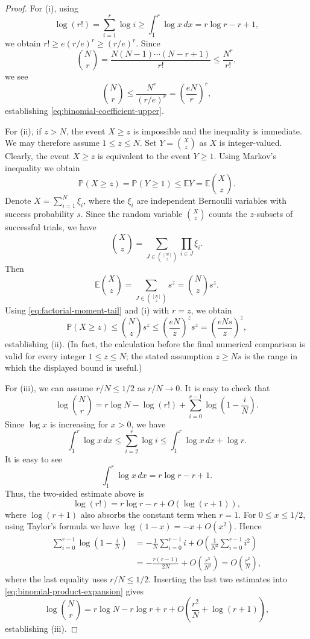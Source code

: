 \documentclass[11pt,reqno]{amsart}
\theoremstyle{definition}
\theoremstyle{remark}
\newcommand{\EE}{\mathbb E}
\newcommand{\PP}{\mathbb P}
\begin{document}
\begin{proof}
For (i), using
\[
 \log(r!)=\sum_{i=1}^r\log i
 \ge\int_1^r\log x\,dx
 =r\log r-r+1,
\]
we obtain $r!\ge e(r/e)^r\ge(r/e)^r$.  Since
\[
 \binom Nr
 =\frac{N(N-1)\cdots(N-r+1)}{r!}
 \le\frac{N^r}{r!},
\]
we see
\[
 \binom Nr\le\frac{N^r}{(r/e)^r}
 =\left(\frac{eN}{r}\right)^r,
\]
establishing \eqref{eq:binomial-coefficient-upper}.

For (ii), if $z>N$, the event $X\ge z$ is impossible and the inequality
is immediate. We may therefore assume $1\le z\le N$.
Set $Y=\binom Xz$ as $X$ is integer-valued. Clearly, the event $X\ge z$ is equivalent to the event $Y\ge1$.  Using Markov's
inequality we obtain
\begin{equation}\label{eq:factorial-moment-tail}
 \PP(X\ge z)=\PP(Y\ge 1)\le\EE Y
 =\EE\binom Xz.
\end{equation}
Denote $X=\sum_{i=1}^N\xi_i$, where the $\xi_i$ are independent Bernoulli
variables with success probability $s$.  Since the random variable $\binom Xz$
counts the $z$-subsets of successful trials, we have
\[
 \binom Xz
 =\sum_{J\in\binom{[N]}z}\prod_{i\in J}\xi_i.
\]
Then
\[
 \EE\binom Xz
 =\sum_{J\in\binom{[N]}z}s^z
 =\binom Nzs^z.
\]
Using \eqref{eq:factorial-moment-tail} and (i) with $r=z$, we obtain 
\[
 \PP(X\ge z)
 \le\binom Nzs^z
 \le\left(\frac{eN}{z}\right)^zs^z
 =\left(\frac{eNs}{z}\right)^z,
\]
establishing (ii).  (In fact, the calculation before the final numerical
comparison is valid for every integer $1\le z\le N$; the stated assumption
$z\ge Ns$ is the range in which the displayed bound is useful.)

For (iii), we can assume $r/N\le1/2$ as $r/N\to0$.  It is easy to check that
\begin{equation}\label{eq:binomial-product-expansion}
 \log\binom Nr
 =r\log N-\log(r!)
  +\sum_{i=0}^{r-1}\log\left(1-\frac{i}{N}\right).
\end{equation}
Since $\log x$ is increasing for $x>0$, we have
\[
 \int_1^r\log x\,dx
 \le\sum_{i=2}^r\log i
 \le\int_1^r\log x\,dx+\log r.
\]
It is easy to see 
$$\int_1^r\log x\,dx=r\log r-r+1.$$
Thus, the two-sided estimate above is
\[
 \log(r!)=r\log r-r+O(\log(r+1)),
\]
where $\log(r+1)$ also absorbs the constant term when $r=1$.
For $0\le x\le1/2$, using Taylor's formula we have 
$\log(1-x)=-x+O(x^2)$.  
Hence
\begin{align*}
 \sum_{i=0}^{r-1}\log\left(1-\frac{i}{N}\right)
 &=-\frac1N\sum_{i=0}^{r-1}i
   +O\!\left(\frac1{N^2}\sum_{i=0}^{r-1}i^2\right)\\
 &=-\frac{r(r-1)}{2N}+O\!\left(\frac{r^3}{N^2}\right)
 =O\!\left(\frac{r^2}{N}\right),
\end{align*}
where the last equality uses $r/N\le1/2$.  Inserting the last two estimates
into \eqref{eq:binomial-product-expansion} gives
\[
 \log\binom Nr
 =r\log N-r\log r+r
  +O\!\left(\frac{r^2}{N}+\log(r+1)\right),
\]
establishing (iii).
\end{proof}
\end{document}

